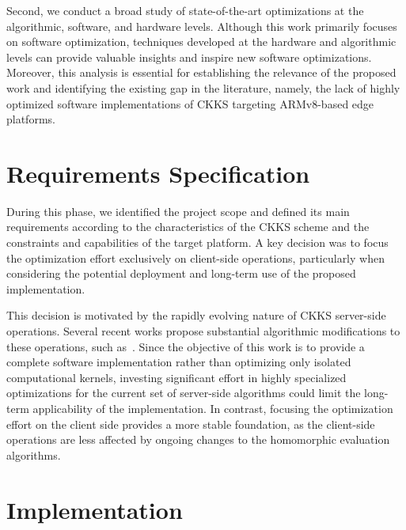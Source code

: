 Second, we conduct a broad study of state-of-the-art optimizations at the algorithmic, software, and hardware levels. Although this work primarily focuses on software optimization, techniques developed at the hardware and algorithmic levels can provide valuable insights and inspire new software optimizations. Moreover, this analysis is essential for establishing the relevance of the proposed work and identifying the existing gap in the literature, namely, the lack of highly optimized software implementations of CKKS targeting ARMv8-based edge platforms.

\section{Requirements Specification}
\label{metodo:req}

During this phase, we identified the project scope and defined its main requirements according to the characteristics of the CKKS scheme and the constraints and capabilities of the target platform. A key decision was to focus the optimization effort exclusively on client-side operations, particularly when considering the potential deployment and long-term use of the proposed implementation.

This decision is motivated by the rapidly evolving nature of CKKS server-side operations. Several recent works propose substantial algorithmic modifications to these operations, such as~\cite{cheon2025ship,cheon2023homomorphic}. Since the objective of this work is to provide a complete software implementation rather than optimizing only isolated computational kernels, investing significant effort in highly specialized optimizations for the current set of server-side algorithms could limit the long-term applicability of the implementation. In contrast, focusing the optimization effort on the client side provides a more stable foundation, as the client-side operations are less affected by ongoing changes to the homomorphic evaluation algorithms.


\section{Implementation}
\label{metodo:imp}

